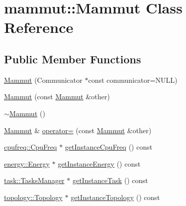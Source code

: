 \hypertarget{classmammut_1_1Mammut}{\section{mammut\-:\-:Mammut Class Reference}
\label{classmammut_1_1Mammut}
}
\subsection*{Public Member Functions}
\begin{DoxyCompactItemize}
\item 
\hyperlink{classmammut_1_1Mammut_a9969f1d5c17e793629a9054523e47078}{Mammut} (Communicator $\ast$const communicator=N\-U\-L\-L)
\item 
\hyperlink{classmammut_1_1Mammut_acdb713bc158da89c42e07f936e2bdaf1}{Mammut} (const \hyperlink{classmammut_1_1Mammut}{Mammut} \&other)
\item 
\hyperlink{classmammut_1_1Mammut_a7de89ade46172cb5e10ee622cf03cf62}{$\sim$\-Mammut} ()
\item 
\hyperlink{classmammut_1_1Mammut}{Mammut} \& \hyperlink{classmammut_1_1Mammut_ae82723eb711875162e875ed399db3358}{operator=} (const \hyperlink{classmammut_1_1Mammut}{Mammut} \&other)
\item 
\hyperlink{classmammut_1_1cpufreq_1_1CpuFreq}{cpufreq\-::\-Cpu\-Freq} $\ast$ \hyperlink{classmammut_1_1Mammut_a6a630059fc041b5b1cf04666231209da}{get\-Instance\-Cpu\-Freq} () const 
\item 
\hyperlink{classmammut_1_1energy_1_1Energy}{energy\-::\-Energy} $\ast$ \hyperlink{classmammut_1_1Mammut_a945bd8e9269bb431a6c33dc20f635c7c}{get\-Instance\-Energy} () const 
\item 
\hyperlink{classmammut_1_1task_1_1TasksManager}{task\-::\-Tasks\-Manager} $\ast$ \hyperlink{classmammut_1_1Mammut_aa4ad17d8a6cd327cf6ef874aed2fd4b0}{get\-Instance\-Task} () const 
\item 
\hyperlink{classmammut_1_1topology_1_1Topology}{topology\-::\-Topology} $\ast$ \hyperlink{classmammut_1_1Mammut_a8833e0d9c1fea917833efdfc9dcc5343}{get\-Instance\-Topology} () const 
\end{DoxyCompactItemize}


